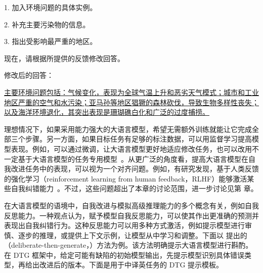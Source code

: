\begin{itemize}
\begin{tcolorbox}
\vspace{0.2em}

\hspace{1em} 1. 加入环境问题的具体实例。

\vspace{0.1em}

\hspace{1em} 2. 补充主要污染物的信息。

\vspace{0.1em}

\hspace{1em} 3. 指出受影响最严重的地区。

\vspace{0.5em}

现在，请根据所提供的反馈修改回答。

\vspace{0.2em}

修改后的回答：

\vspace{0.2em}

\uline{主要环境问题包括：气候变化，表现为全球气温上升和恶劣天气模式；城市和工业地区严重的空气和水污染；亚马孙等地区猖獗的森林砍伐，导致生物多样性丧失；以及海洋环境退化，其突出表现是珊瑚礁白化和广泛的过度捕捞。}

\endgroup

\end{tcolorbox}
\vspace{0.5em}

\end{itemize}

理想情况下，如果采用能力强大的大语言模型，希望无需额外训练就能让它完成全部三个步骤。另一方面，如果目标任务有足够的标注数据，可以用监督学习提高模型表现。例如，可以通过微调，让大语言模型更好地适应修改任务，也可以改用不一定基于大语言模型的任务专用模型~\cite{welleck-etal:2023generating,schick-etal:2023peer}。从更广泛的角度看，提高大语言模型在自我改进任务中的表现，可以视为一个对齐问题。例如，有研究发现，基于人类反馈的强化学习（reinforcement learning from human feedback，RLHF）能够激活某些自我纠错能力~\cite{ganguli-etal:2023capacity}。不过，这些问题超出了本章的讨论范围，进一步讨论见第 \ChapterLLMTuning 章。

在大语言模型的语境中，自我改进与模拟高级推理能力的多个概念有关，例如自我反思能力。一种观点认为，赋予模型自我反思能力，可以使其作出更准确的预测并表现出自我纠错行为。这种反思能力可以用多种方式激活，例如提示模型进行审慎、逐步的推理，或提供上下文示例，让模型从中学习和调整。下面以 \citet{li2023-etal:deliberate} 提出的（deliberate-then-generate，）方法为例。该方法明确提示大语言模型进行斟酌。在 DTG 框架中，给定可能有缺陷的初始模型输出，先提示模型识别具体错误类型，再给出改进后的版本。下面是用于中译英任务的 DTG 提示模板。


